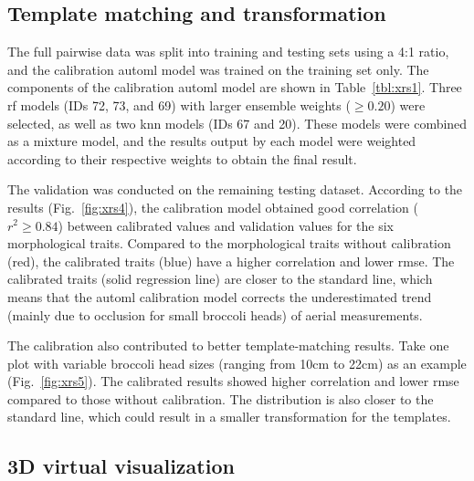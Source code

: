 

\subsection{Template matching and transformation}

The full pairwise data was split into training and testing sets using a 4:1 ratio, and the calibration \gls{automl} model was trained on the training set only. The components of the calibration \gls{automl} model are shown in  Table~\ref{tbl:xrs1}. Three \gls{rf} models (IDs 72, 73, and 69) with larger ensemble weights ($\geq 0.20$) were selected, as well as two \gls{knn} models (IDs 67 and 20). These models were combined as a mixture model, and the results output by each model were weighted according to their respective weights to obtain the final result.



The validation was conducted on the remaining testing dataset. According to the results (Fig.~\ref{fig:xrs4}), the calibration model obtained good correlation ($r^2 \geq 0.84$) between calibrated values and validation values for the six morphological traits. Compared to the morphological traits without calibration (red), the calibrated traits (blue) have a higher correlation and lower \gls{rmse}. The calibrated traits (solid regression line) are closer to the standard line, which means that the \gls{automl} calibration model corrects the underestimated trend (mainly due to occlusion for small broccoli heads) of aerial measurements.



The calibration also contributed to better template-matching results. Take one plot with variable broccoli head sizes (ranging from 10cm to 22cm) as an example (Fig.~\ref{fig:xrs5}). The calibrated results showed higher correlation and lower \gls{rmse} compared to those without calibration. The distribution is also closer to the standard line, which could result in a smaller transformation for the templates.



\subsection{3D virtual visualization}

